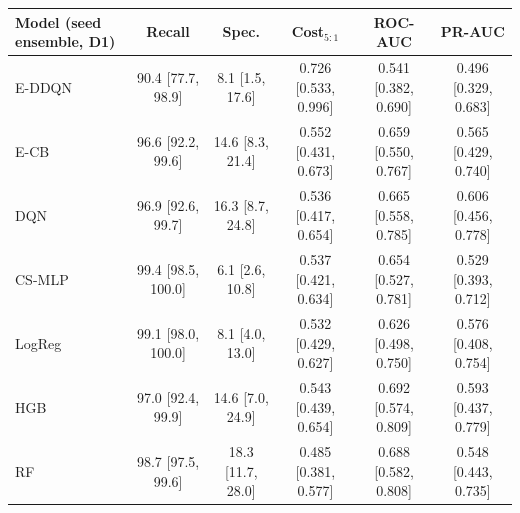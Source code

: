 \begin{tabular}{lccccc}
\toprule
Model (seed ensemble, D1) & Recall & Spec. & Cost$_{5:1}$ & ROC-AUC & PR-AUC \\
\midrule
E-DDQN & 90.4 [77.7, 98.9] & 8.1 [1.5, 17.6] & 0.726 [0.533, 0.996] & 0.541 [0.382, 0.690] & 0.496 [0.329, 0.683] \\
E-CB & 96.6 [92.2, 99.6] & 14.6 [8.3, 21.4] & 0.552 [0.431, 0.673] & 0.659 [0.550, 0.767] & 0.565 [0.429, 0.740] \\
DQN & 96.9 [92.6, 99.7] & 16.3 [8.7, 24.8] & 0.536 [0.417, 0.654] & 0.665 [0.558, 0.785] & 0.606 [0.456, 0.778] \\
CS-MLP & 99.4 [98.5, 100.0] & 6.1 [2.6, 10.8] & 0.537 [0.421, 0.634] & 0.654 [0.527, 0.781] & 0.529 [0.393, 0.712] \\
LogReg & 99.1 [98.0, 100.0] & 8.1 [4.0, 13.0] & 0.532 [0.429, 0.627] & 0.626 [0.498, 0.750] & 0.576 [0.408, 0.754] \\
HGB & 97.0 [92.4, 99.9] & 14.6 [7.0, 24.9] & 0.543 [0.439, 0.654] & 0.692 [0.574, 0.809] & 0.593 [0.437, 0.779] \\
RF & 98.7 [97.5, 99.6] & 18.3 [11.7, 28.0] & 0.485 [0.381, 0.577] & 0.688 [0.582, 0.808] & 0.548 [0.443, 0.735] \\
\bottomrule
\end{tabular}

